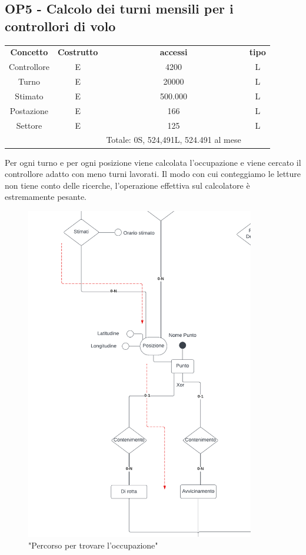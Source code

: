     \subsection*{OP5 - Calcolo dei turni mensili per i controllori di volo}
    \begin{table}[H]
    \centering
    \begin{tabular}{cccc}
  
    \rowcolor{tableheadercolor}
    \textbf{Concetto} & \textbf{Costrutto} & \textbf{accessi} & \textbf{tipo}\\
  
    Controllore & E & 4200 & L \\
    Turno & E & 20000 & L \\
    Stimato & E & 500.000 & L \\
    Postazione & E & 166 & L \\
    Settore & E & 125 & L \\
    & & Totale: 0S, 524,491L, 524.491 al mese &\\
  
    \end{tabular}
    \end{table}
    Per ogni turno e per ogni posizione viene calcolata l'occupazione e viene cercato il controllore adatto con meno turni lavorati.
    Il modo con cui conteggiamo le letture non tiene conto delle ricerche, l'operazione effettiva sul calcolatore è estremamente pesante.
    \begin{figure}[H]
      \centering
      \includegraphics[width=10cm]{figures/BasicControllerarrowsp1.pdf}
      \caption{"Percorso per trovare l'occupazione"}
    \end{figure}
